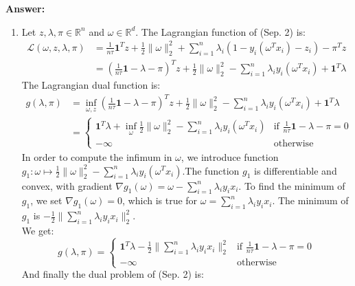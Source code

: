 \documentclass[11pt,a4paper]{article}
\newenvironment{solution}{
  \par\noindent\textbf{Answer:}\vspace{0.3em}
}{\vspace{1em}}
\begin{document}
\begin{solution}
\begin{enumerate}
        \item Let $z, \lambda, \pi \in \mathbb{R}^n$ and $\omega \in \mathbb{R}^d$. The Lagrangian function of (Sep. 2) is: $$\begin{aligned}
            \mathcal{L}(\omega, z, \lambda, \pi)
            &= \frac{1}{n\tau} \boldsymbol{1}^T z + \frac{1}{2}\|\omega\|_2^2 + \sum_{i=1}^n \lambda_i (1 - y_i(\omega^T x_i) - z_i) - \pi^T z\\
            &= \left(\frac{1}{n\tau} \boldsymbol{1} - \lambda - \pi\right)^T z + \frac{1}{2}\|\omega\|_2^2 - \sum_{i=1}^n \lambda_i y_i (\omega^T x_i) + \boldsymbol{1}^T \lambda
        \end{aligned}$$
        The Lagrangian dual function is: $$\begin{aligned}
            g(\lambda, \pi)
            &= \inf_{\omega, z}  \left(\frac{1}{n\tau} \boldsymbol{1} - \lambda - \pi\right)^T z + \frac{1}{2}\|\omega\|_2^2 - \sum_{i=1}^n \lambda_i y_i (\omega^T x_i) + \boldsymbol{1}^T \lambda\\
            &= \begin{cases}
                \boldsymbol{1}^T \lambda + \inf_\omega \frac{1}{2} \|\omega\|_2^2 - \sum_{i=1}^n \lambda_i y_i (\omega^T x_i) &\text{if } \frac{1}{n\tau}\boldsymbol{1} - \lambda - \pi = 0\\
                -\infty &\text{otherwise}
            \end{cases}
        \end{aligned}$$
        In order to compute the infimum in $\omega$, we introduce function $g_1 : \omega \mapsto \frac{1}{2} \|\omega\|_2^2 - \sum_{i=1}^n \lambda_i y_i (\omega^T x_i)$.The function $g_1$ is differentiable and convex, with gradient $\nabla g_1(\omega) = \omega - \sum_{i=1}^n \lambda_i y_i x_i$. To find the minimum of $g_1$, we set $\nabla g_1 (\omega) = 0$, which is true for $\omega = \sum_{i=1}^n \lambda_i y_i x_i$. The minimum of $g_1$ is $-\frac{1}{2} \| \sum_{i=1}^n \lambda_i y_i x_i \|_2^2$.\\
        We get: $$g(\lambda, \pi) = \begin{cases}
            \boldsymbol{1}^T \lambda - \frac{1}{2} \| \sum_{i=1}^n \lambda_i y_i x_i \|_2^2 &\text{if } \frac{1}{n\tau}\boldsymbol{1} - \lambda - \pi = 0\\
                -\infty &\text{otherwise}
        \end{cases}$$
        And finally the dual problem of (Sep. 2) is: $$\begin{aligned}

\end{aligned}$$
\end{enumerate}
\end{solution}
\end{document}
